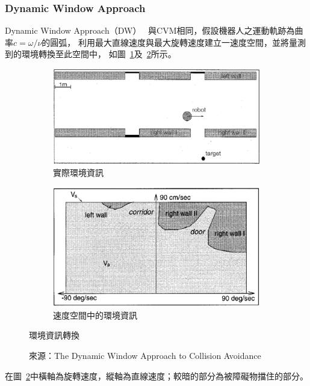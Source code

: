 \subsubsection{Dynamic Window Approach}
Dynamic Window Approach（DW）~\cite{Thrun:1997:DW}
與CVM相同，假設機器人之運動軌跡為曲率$c=\omega/\nu$的圓弧，
利用最大直線速度與最大旋轉速度建立一速度空間，並將量測到的環境轉換至此空間中，
如圖~\ref{f:DW_cartesian}及~\ref{f:DW_velocity}所示。
\begin{figure}[h!]
	\centering
	\begin{subfigure}[t]{0.6\textwidth}
		\includegraphics[width=\textwidth]{figures/algorithm/DW_cartesian}
		\caption{實際環境資訊}
		\label{f:DW_cartesian}
	\end{subfigure}
	\begin{subfigure}[t]{0.6\textwidth}
		\includegraphics[width=\textwidth]{figures/algorithm/DW_velocity}
		\caption{速度空間中的環境資訊}
		\label{f:DW_velocity}
	\end{subfigure}
	\caption{環境資訊轉換}
	\caption*{來源：The Dynamic Window Approach to Collision Avoidance}
	\label{f:v_space}
\end{figure}
在圖~\ref{f:DW_velocity}中橫軸為旋轉速度，縱軸為直線速度；較暗的部分為被障礙物擋住的部分。


